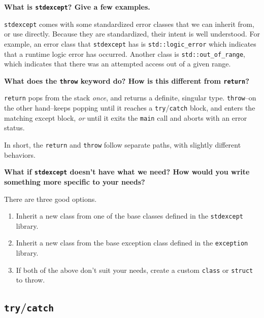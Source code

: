 \documentclass[12pt, letterpaper]{article}
\newcommand{\question}[1]{\textbf{#1}\par}
\newenvironment{answerblock}{\color{Green4}}{\normalcolor\vspace{1em}}
\begin{document}
\question{What is \texttt{stdexcept}? Give a few examples.}
\begin{answerblock}
\texttt{stdexcept} comes with some standardized error classes that we can
inherit from, or use directly. Because they are standardized, their intent is
well understood. For example, an error class that \texttt{stdexcept} has is
\texttt{std::logic\_error} which indicates that a runtime logic error has
occurred. Another class is \texttt{std::out\_of\_range}, which indicates that
there was an attempted access out of a given range.
\end{answerblock}

\question{What does the \texttt{throw} keyword do? How is this different from
\texttt{return}?}

\begin{answerblock}
\texttt{return} pops from the stack \emph{once}, and returns a definite,
singular type. \texttt{throw}--on the other hand--keeps popping until it reaches
a \texttt{try}/\texttt{catch} block, and enters the matching except block,
\emph{or} until it exits the \texttt{main} call and aborts with an error status.

In short, the \texttt{return} and \texttt{throw} follow separate paths, with
slightly different behaviors.
\end{answerblock}

\begin{minipage}{\textwidth}
\question{What if \texttt{stdexcept} doesn't have what we need? How would you
write something more specific to your needs?}
\begin{answerblock}
There are three good options.

\begin{enumerate}
    \item Inherit a new class from one of the base classes defined in the
    \texttt{stdexcept} library.
    \item Inherit a new class from the base exception class defined in the
    \texttt{exception} library.
    \item If both of the above don't suit your needs, create a custom
    \texttt{class} or \texttt{struct} to throw.
\end{enumerate}
\end{answerblock}
\end{minipage}

\subsection{\texttt{try}/\texttt{catch}}
\end{document}
